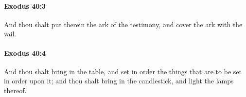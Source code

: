 		\paragraph{Exodus 40:3} %
			\label{EXODUS-40-3}

			And thou shalt put therein the ark of the testimony, and cover the ark with the vail.


		\paragraph{Exodus 40:4} %
			\label{EXODUS-40-4}

			And thou shalt bring in the table, and set in order the things that are to be set in order upon it; and thou shalt bring in the candlestick, and light the lamps thereof.


